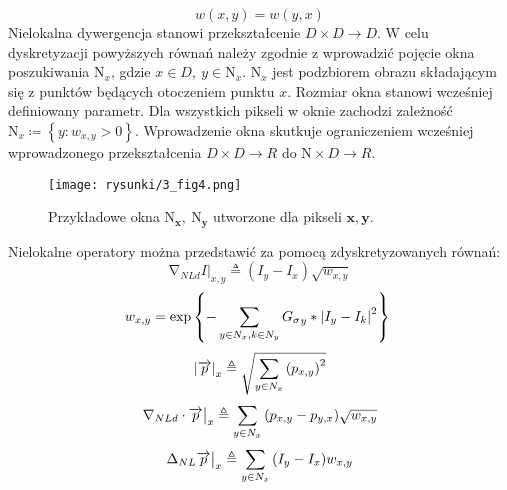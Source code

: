 \documentclass[12pt, twoside, openany]{report}
\theoremstyle{definition}
\begin{document}
\begin{equation}
w(x,y) = w(y,x)
\label{SMARTWEIGHT}
\end{equation}
Nielokalna dywergencja stanowi przekształcenie $D \times D \longrightarrow D$.
W celu dyskretyzacji powyższych równań należy zgodnie z \cite{gilboa2008nonlocal} wprowadzić pojęcie okna poszukiwania ${\mathrm{N}}_x$, gdzie $x\in D,\ y\in {\mathrm{N}}_x$. ${\mathrm{N}}_x$ jest podzbiorem obrazu składającym się z punktów będących otoczeniem punktu $x$. Rozmiar okna stanowi wcześniej definiowany parametr. Dla wszystkich pikseli w oknie zachodzi zależność ${\mathrm{N}}_x\coloneqq \left\{y:w_{x,y}>0\right\}$. Wprowadzenie okna skutkuje ograniczeniem wcześniej wprowadzonego przekształcenia $D \times D\longrightarrow R$ do $\mathrm{N} \times D\longrightarrow R$.
\begin{figure}[!h]
	\centering
	\texttt{[image: rysunki/3\_fig4.png]}
	\caption{Przykładowe okna ${\boldsymbol{\mathrm{N}}}_{\boldsymbol{x}}\boldsymbol{,\ }{\boldsymbol{\mathrm{N}}}_{\boldsymbol{y}}$ utworzone dla pikseli $\boldsymbol{x},\boldsymbol{y}$.}
	\label{3_fig4}
\end{figure}
\par
Nielokalne operatory można przedstawić za pomocą zdyskretyzowanych równań:
\begin{equation}
{\mathrm{\nabla }}_{NLd}I|_{x,y}\triangleq \left(I_y-I_x\right)\sqrt{w_{x,y}}
\label{DNLGRAD}
\end{equation}
\begin{equation}
w_{x,y}={\mathrm{exp} \left\{-\sum_{y\in N_x,k\in N_y \\
}{{G_{\sigma}}_y \ast {\left|I_y-I_k\right|}^2}\right\}\ }
\label{DNLWEIGHT}
\end{equation}
\begin{equation}
{\left|\overrightarrow{p}\right|}_x\triangleq \sqrt{\sum_{y\in N_x \\ 
}{{\left(p_{x,y}\right)}^2}}
\label{DNLMAG}
\end{equation}
\begin{equation}
{\mathrm{\nabla }}_{NLd}\cdot \overrightarrow{p}\big|_x \triangleq \sum_{ 
y\in N_x \\ 
}{\left(p_{x,y}-p_{y,x}\right)}\sqrt{w_{x,y}}
\label{DNLDIV}
\end{equation}
\begin{equation}
{\mathrm{\Delta }}_{NL}{\overrightarrow{p}}\big|_x \triangleq \sum_{
y\in N_x \\ 
}{\left(I_y-I_x\right)}w_{x,y}
\label{DNLLAP}
\end{equation}
\end{document}
